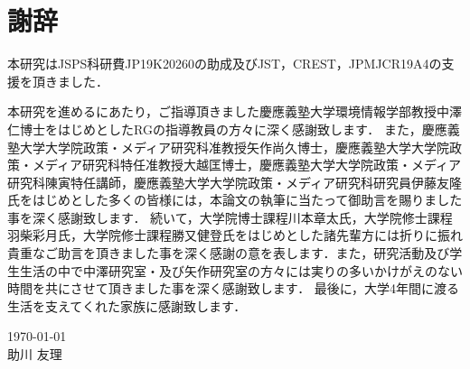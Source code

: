 \chapter*{謝辞}
本研究はJSPS科研費JP19K20260の助成及びJST，CREST，JPMJCR19A4の支援を頂きました．

本研究を進めるにあたり，ご指導頂きました慶應義塾大学環境情報学部教授中澤仁博士をはじめとしたRGの指導教員の方々に深く感謝致します．
また，慶應義塾大学大学院政策・メディア研究科准教授矢作尚久博士，慶應義塾大学大学院政策・メディア研究科特任准教授大越匡博士，慶應義塾大学大学院政策・メディア研究科陳寅特任講師，慶應義塾大学大学院政策・メディア研究科研究員伊藤友隆氏をはじめとした多くの皆様には，本論文の執筆に当たって御助言を賜りました事を深く感謝致します．
続いて，大学院博士課程川本章太氏，大学院修士課程羽柴彩月氏，大学院修士課程勝又健登氏をはじめとした諸先輩方には折りに振れ貴重なご助言を頂きました事を深く感謝の意を表します．また，研究活動及び学生生活の中で中澤研究室・及び矢作研究室の方々には実りの多いかけがえのない時間を共にさせて頂きました事を深く感謝致します．
最後に，大学4年間に渡る生活を支えてくれた家族に感謝致します．

\begin{flushright}
\today\\
助川 友理
\end{flushright}